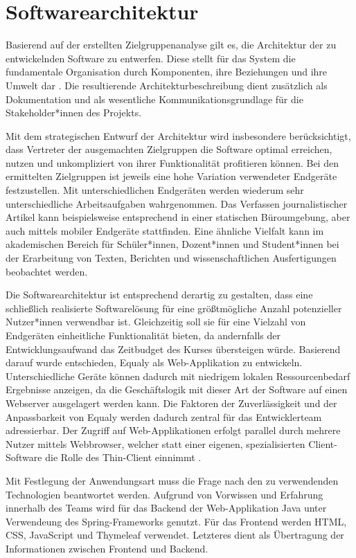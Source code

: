 \section{Softwarearchitektur}
\label{sec:softwarearchitektur}

Basierend auf der erstellten Zielgruppenanalyse gilt es, die Architektur der zu entwickelnden Software zu entwerfen. Diese stellt für das System die fundamentale Organisation durch Komponenten, ihre Beziehungen und ihre Umwelt dar \cite{Hi00}. Die resultierende Architekturbeschreibung dient zusätzlich als Dokumentation und als wesentliche Kommunikationsgrundlage für die Stakeholder*innen des Projekts.

Mit dem strategischen Entwurf der Architektur wird insbesondere berücksichtigt, dass Vertreter der ausgemachten Zielgruppen die Software optimal erreichen, nutzen und unkompliziert von ihrer Funktionalität profitieren können. Bei den ermittelten Zielgruppen ist jeweils eine hohe Variation verwendeter Endgeräte festzustellen. Mit unterschiedlichen Endgeräten werden wiederum sehr unterschiedliche Arbeitsaufgaben wahrgenommen. Das Verfassen journalistischer Artikel kann beispielsweise entsprechend in einer statischen Büroumgebung, aber auch mittels mobiler Endgeräte stattfinden. Eine ähnliche Vielfalt kann im akademischen Bereich für Schüler*innen, Dozent*innen und Student*innen bei der Erarbeitung von Texten, Berichten und wissenschaftlichen Ausfertigungen beobachtet werden.

Die Softwarearchitektur ist entsprechend derartig zu gestalten, dass eine schließlich realisierte Softwarelösung für eine größtmögliche Anzahl potenzieller Nutzer*innen verwendbar ist. Gleichzeitig soll sie für eine Vielzahl von Endgeräten einheitliche Funktionalität bieten, da andernfalls der Entwicklungsaufwand das Zeitbudget des Kurses übersteigen würde. Basierend darauf wurde entschieden, Equaly als Web-Applikation zu entwickeln. Unterschiedliche Geräte können dadurch mit niedrigem lokalen Ressourcenbedarf Ergebnisse anzeigen, da die Geschäftslogik mit dieser Art der Software auf einen Webserver ausgelagert werden kann. Die Faktoren der Zuverlässigkeit und der Anpassbarkeit von Equaly werden dadurch zentral für das Entwicklerteam adressierbar. Der Zugriff auf Web-Applikationen erfolgt parallel durch mehrere Nutzer mittels Webbrowser, welcher statt einer eigenen, spezialisierten Client-Software die Rolle des Thin-Client einnimmt \cite{Wu01}.

Mit Festlegung der Anwendungsart muss die Frage nach den zu verwendenden Technologien beantwortet werden.
Aufgrund von Vorwissen und Erfahrung innerhalb des Teams wird für das Backend der Web-Applikation Java unter Verwendeung des Spring-Frameworks genutzt. Für das Frontend werden HTML, CSS, JavaScript und Thymeleaf verwendet. Letzteres dient als Übertragung der Informationen zwischen Frontend und Backend.


